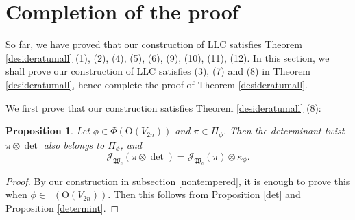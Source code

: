 \documentclass[article]{article}
\numberwithin{equation}{section}
\newtheorem{proposition}[theorem]{Proposition}
\theoremstyle{definition}
\DeclareMathOperator{\Para}{\Phi_{temp}}
\begin{document}
\section{Completion of the proof}
So far, we have proved that our construction of LLC satisfies Theorem \ref{desideratumall} (1), (2), (4), (5), (6), (9), (10), (11), (12). In this section, we shall prove our construction of LLC satisfies (3), (7) and (8) in Theorem \ref{desideratumall}, hence complete the proof of Theorem \ref{desideratumall}. 


We first prove that our construction satisfies Theorem \ref{desideratumall} (8): 
\begin{proposition}\label{dettwistfinal}
Let $\phi\in \Phi(\mathrm O(V_{2n}))$ and $\pi\in \Pi_{\phi}$. Then the determinant twist $\pi\otimes \det$ also belongs to $\Pi_{\phi}$, and 
$$\mathcal J_{\mathfrak W_{c}}(\pi \otimes \det)=\mathcal J_{\mathfrak W_{c}}(\pi)\otimes  \kappa_{\phi}.$$
\end{proposition}
\begin{proof}
	By our construction in subsection \ref{nontempered}, it is enough to prove this when $\phi\in \Para(\mathrm O(V_{2n}))$. Then this follows from Proposition \ref{det} and Proposition \ref{determint}. 
\end{proof}
\end{document}
